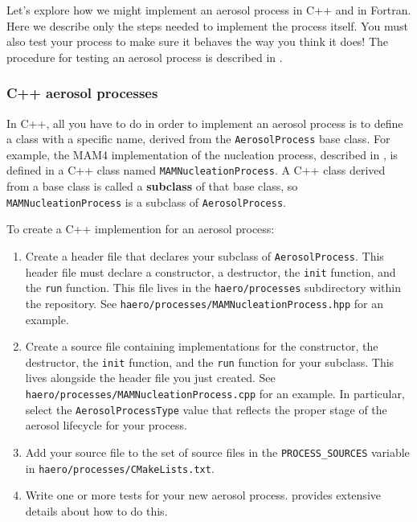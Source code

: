 Let's explore how we might implement an aerosol process in C++ and in Fortran.
Here we describe only the steps needed to implement the process itself. You must
also test your process to make sure it behaves the way you think it does! The
procedure for testing an aerosol process is described in
.

\subsubsection{C++ aerosol processes}

In C++, all you have to do in order to implement an aerosol process is to define
a class with a specific name, derived from the \texttt{AerosolProcess} base
class. For example, the MAM4 implementation of the nucleation process, described
in , is defined in a C++ class named
\texttt{MAMNucleationProcess}. A C++ class derived from a base class is called a
{\bf subclass} of that base class, so \texttt{MAMNucleationProcess} is a
subclass of \texttt{AerosolProcess}.

To create a C++ implemention for an aerosol process:

\begin{enumerate}
  \item Create a header file that declares your subclass of
        \texttt{AerosolProcess}. This header file must declare a constructor,
        a destructor, the \texttt{init} function, and the \texttt{run} function.
        This file lives in the \texttt{haero/processes} subdirectory within the
        repository. See \texttt{haero/processes/MAMNucleationProcess.hpp} for an
        example.
  \item Create a source file containing implementations for the constructor, the
        destructor, the \texttt{init} function, and the \texttt{run} function for
        your subclass. This lives alongside the header file you just created.
        See \texttt{haero/processes/MAMNucleationProcess.cpp} for an example.
        In particular, select the \texttt{AerosolProcessType} value that
        reflects the proper stage of the aerosol lifecycle for your process.
  \item Add your source file to the set of source files in the
        \texttt{PROCESS\_SOURCES} variable in \texttt{haero/processes/CMakeLists.txt}.
  \item Write one or more tests for your new aerosol process.
         provides extensive details about how to do this.
\end{enumerate}

